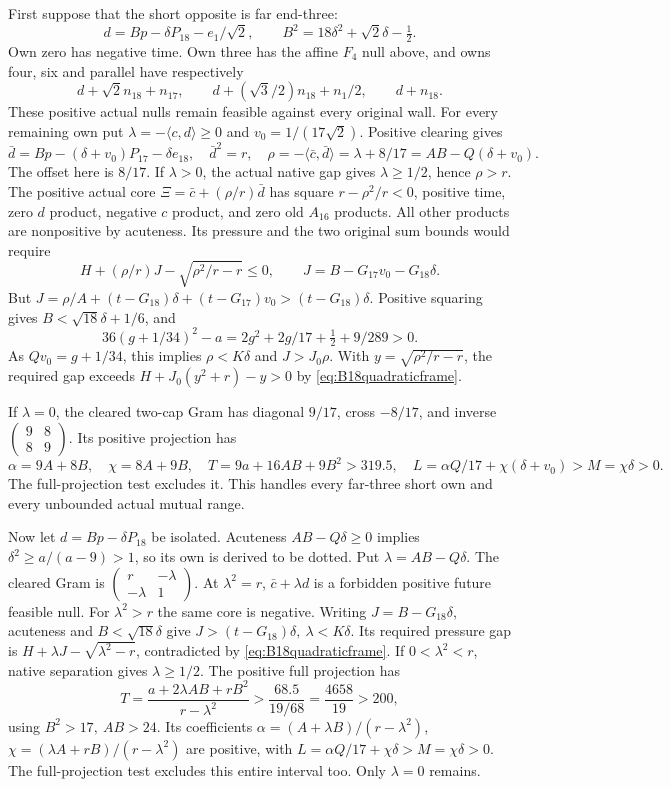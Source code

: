 \documentclass[11pt]{article}
\theoremstyle{definition}
\theoremstyle{remark}
\newcommand{\ip}[2]{\langle #1,#2\rangle}
\begin{document}
First suppose that the short opposite is far end-three:
\[
 d=Bp-\delta P_{18}-e_1/\sqrt2,\qquad
 B^2=18\delta^2+\sqrt2\delta-\tfrac12 .
\]
Own zero has negative time. Own three has the affine \(F_4\)
null above, and owns four, six and parallel have respectively
\[
 d+\sqrt2n_{18}+n_{17},\qquad
 d+(\sqrt3/2)n_{18}+n_1/2,\qquad d+n_{18}.
\]
These positive actual nulls remain feasible against every original wall.
For every remaining own put \(\lambda=-\ip cd\geq0\) and
\(v_0=1/(17\sqrt2)\). Positive clearing gives
\[
 \bar d=Bp-(\delta+v_0)P_{17}-\delta e_{18},\quad
 \bar d^2=r,\quad
 \rho=-\ip{\bar c}{\bar d}=\lambda+8/17
       =AB-Q(\delta+v_0).
\]
The offset here is \(8/17\). If \(\lambda>0\), the actual native
gap gives \(\lambda\geq1/2\), hence \(\rho>r\).
The positive actual core \(\Xi=\bar c+(\rho/r)\bar d\)
has square \(r-\rho^2/r<0\), positive time, zero \(d\) product,
negative \(c\) product, and zero old \(A_{16}\) products.
All other products are nonpositive by acuteness.
Its pressure and the two original sum bounds would require
\[
 H+(\rho/r)J-\sqrt{\rho^2/r-r}\leq0,\qquad
 J=B-G_{17}v_0-G_{18}\delta .
\]
But \(J=\rho/A+(t-G_{18})\delta+(t-G_{17})v_0
>(t-G_{18})\delta\).
Positive squaring gives \(B<\sqrt{18}\delta+1/6\), and
\[
 36(g+1/34)^2-a
 =2g^2+2g/17+\tfrac12+9/289>0 .
\]
As \(Qv_0=g+1/34\), this implies \(\rho<K\delta\)
and \(J>J_0\rho\).
With \(y=\sqrt{\rho^2/r-r}\), the required gap exceeds
\(H+J_0(y^2+r)-y>0\) by \eqref{eq:B18quadraticframe}.

If \(\lambda=0\), the cleared two-cap Gram has diagonal \(9/17\),
cross \(-8/17\), and inverse
\(\left(\begin{smallmatrix}9&8\\8&9\end{smallmatrix}\right)\).
Its positive projection has
\[
 \alpha=9A+8B,\quad \chi=8A+9B,\quad
 T=9a+16AB+9B^2>319.5,\quad
 L=\alpha Q/17+\chi(\delta+v_0)>M=\chi\delta>0 .
\]
The full-projection test excludes it. This handles every far-three
short own and every unbounded actual mutual range.

Now let \(d=Bp-\delta P_{18}\) be isolated.
Acuteness \(AB-Q\delta\geq0\) implies
\(\delta^2\geq a/(a-9)>1\), so its own is derived to be dotted.
Put \(\lambda=AB-Q\delta\).
The cleared Gram is
\(\left(\begin{smallmatrix}r&-\lambda\\-\lambda&1\end{smallmatrix}\right)\).
At \(\lambda^2=r\), \(\bar c+\lambda d\) is a forbidden positive
future feasible null. For \(\lambda^2>r\) the same core is negative.
Writing \(J=B-G_{18}\delta\), acuteness and \(B<\sqrt{18}\delta\)
give \(J>(t-G_{18})\delta,\ \lambda<K\delta\).
Its required pressure gap is
\(H+\lambda J-\sqrt{\lambda^2-r}\), contradicted by
\eqref{eq:B18quadraticframe}.
If \(0<\lambda^2<r\), native separation gives \(\lambda\geq1/2\).
The positive full projection has
\[
 T=\frac{a+2\lambda AB+rB^2}{r-\lambda^2}
 >\frac{68.5}{19/68}=\frac{4658}{19}>200 ,
\]
using \(B^2>17,\ AB>24\).
Its coefficients
\(\alpha=(A+\lambda B)/(r-\lambda^2)\),
\(\chi=(\lambda A+rB)/(r-\lambda^2)\)
are positive, with \(L=\alpha Q/17+\chi\delta>M=\chi\delta>0\).
The full-projection test excludes this entire interval too.
Only \(\lambda=0\) remains.
\end{document}

